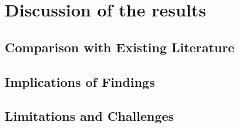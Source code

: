 \chapter{Discussion of the results}

\section{Comparison with Existing Literature}


\section{Implications of Findings}


\section{Limitations and Challenges}
